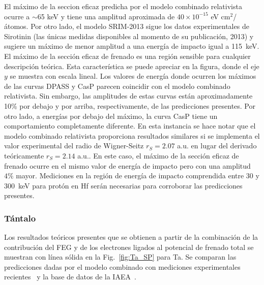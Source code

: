 El máximo de la seccion eficaz predicha por el modelo combinado 
relativista ocurre a $\sim$65 keV y tiene una amplitud aproximada de 
$40\times 10^{-15}$ eV cm$^2$/átomos. Por otro lado, el modelo SRIM-2013
sigue los datos experimentales de Sirotinin (las únicas medidas 
disponibles al momento de su publicación, 2013) y sugiere un máximo de 
menor amplitud a una energía de impacto igual a 115~keV. 
El máximo de la sección eficaz de frenado es una región sensible para 
cualquier descripción teórica. Esta característica se puede apreciar en 
la figura, donde el eje $y$ se muestra con escala lineal. 
Los valores de energía donde ocurren los máximos de las curvas DPASS y 
CasP parecen coincidir con el modelo combinado relativista. Sin embargo, 
las amplitudes de estas curvas están aproximadamente 10\% por debajo y 
por arriba, respectivamente, de las predicciones presentes. Por otro 
lado, a energías por debajo del máximo, la curva CasP tiene un 
comportamiento completamente diferente. En esta instancia se hace notar 
que el modelo combinado relativista proporciona resultados similares 
si se implementa el valor experimental del radio de Wigner-Seitz 
$r_S=2.07$ a.u. en lugar del derivado teóricamente $r_S=2.14$ a.u.. En 
este caso, el máximo de la sección eficaz de frenado ocurre en el mismo
valor de energía de impacto pero con una amplitud $4\%$ mayor. 
Mediciones en la región de energía de impacto comprendida entre 30 y 
300~keV para protón en Hf serán necesarias para corroborar las 
predicciones presentes. 


\subsubsection{Tántalo}

Los resultados teóricos presentes que se obtienen a partir de la 
combinación de la contribución del FEG y de los electrones ligados al 
potencial de frenado total se muestran con línea sólida en la 
Fig.~\ref{fig:Ta_SP} para Ta. Se comparan las predicciones dadas por el
modelo combinado con mediciones experimentales 
recientes~\cite{Moro:20,Roth:17} y la base de datos de la 
IAEA~\cite{iaea,Krist:83,Sirotinin:84,Ogino:88,Bichsel:92,Shiomi:94,
Shiomi:96}.

